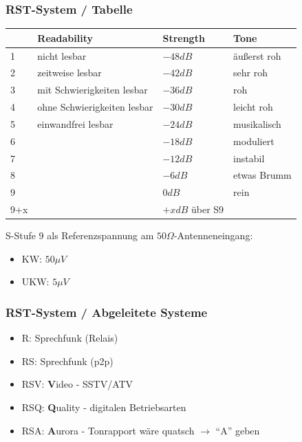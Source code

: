 \begin{frame}
  \frametitle{RST-System / Tabelle}

  \begin{center}
    \footnotesize
    \begin{tabular}{|l|l|l|l|}\hline
      & \textbf{R}eadability        & \textbf{S}trength & \textbf{T}one \\ \hline \hline
      1 & nicht lesbar                & $-48 dB$          & äußerst roh   \\ \hline
      2 & zeitweise lesbar            & $-42 dB$          & sehr roh      \\ \hline
      3 & mit Schwierigkeiten lesbar  & $-36 dB$          & roh           \\ \hline
      4 & ohne Schwierigkeiten lesbar & $-30 dB$          & leicht roh    \\ \hline
      5 & einwandfrei lesbar          & $-24 dB$          & musikalisch   \\ \hline
      6 &                             & $-18 dB$          & moduliert     \\ \hline
      7 &                             & $-12 dB$          & instabil      \\ \hline
      8 &                             & $-6 dB$           & etwas Brumm   \\ \hline
      9 &                             & $0dB$             & rein          \\ \hline
      9+x &                           & $+x dB$ über S9   &               \\ \hline
    \end{tabular}
  \end{center}

  S-Stufe 9 als Referenzspannung am $50 \Omega$-Antenneneingang:
  \begin{itemize}
    \item KW: $50\mu V$
    \item UKW: $5\mu V$
  \end{itemize}

\end{frame}

\begin{frame}
  \frametitle{RST-System / Abgeleitete Systeme}

  \begin{itemize}
    \item R: Sprechfunk (Relais)
    \item RS: Sprechfunk (p2p)
    \item RSV: \textbf{V}ideo - SSTV/ATV
    \item RSQ: \textbf{Q}uality - digitalen Betriebsarten
    \item RSA: \textbf{A}urora - Tonrapport wäre quatsch $\rightarrow$ ``A'' geben
  \end{itemize}

\end{frame}


